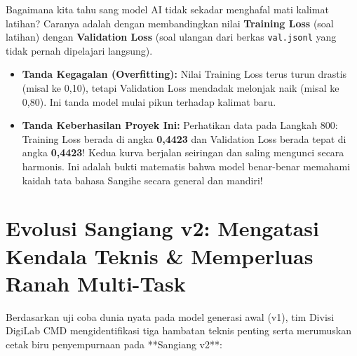 \begin{linguisticbox}
Bagaimana kita tahu sang model AI tidak sekadar menghafal mati kalimat latihan? Caranya adalah dengan membandingkan nilai \textbf{Training Loss} (soal latihan) dengan \textbf{Validation Loss} (soal ulangan dari berkas \texttt{val.jsonl} yang tidak pernah dipelajari langsung).
\begin{itemize}
    \item \textbf{Tanda Kegagalan (Overfitting):} Nilai Training Loss terus turun drastis (misal ke 0,10), tetapi Validation Loss mendadak melonjak naik (misal ke 0,80). Ini tanda model mulai pikun terhadap kalimat baru.
    \item \textbf{Tanda Keberhasilan Proyek Ini:} Perhatikan data pada Langkah 800: Training Loss berada di angka \textbf{0,4423} dan Validation Loss berada tepat di angka \textbf{0,4423}! Kedua kurva berjalan seiringan dan saling mengunci secara harmonis. Ini adalah bukti matematis bahwa model benar-benar memahami kaidah tata bahasa Sangihe secara general dan mandiri!
\end{itemize}
\end{linguisticbox}

\section{Evolusi Sangiang v2: Mengatasi Kendala Teknis \& Memperluas Ranah Multi-Task}
Berdasarkan uji coba dunia nyata pada model generasi awal (v1), tim Divisi DigiLab CMD mengidentifikasi tiga hambatan teknis penting serta merumuskan cetak biru penyempurnaan pada **Sangiang v2**:

